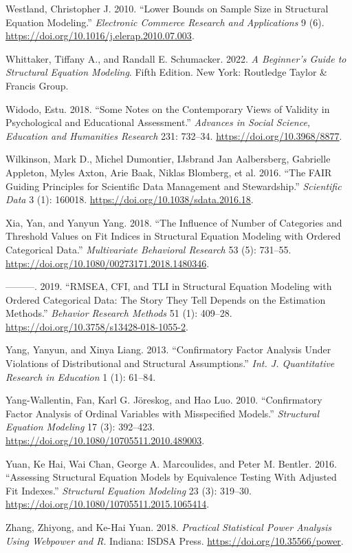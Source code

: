 \documentclass[
  a4paper,
]{article}
\newlength{\cslhangindent}
\newenvironment{CSLReferences}[2] %
 {\begin{list}{}{%
  \setlength{\itemindent}{0pt}
  \setlength{\leftmargin}{0pt}
  \setlength{\parsep}{0pt}
  \ifodd #1
   \setlength{\leftmargin}{\cslhangindent}
   \setlength{\itemindent}{-1\cslhangindent}
  \fi
  \setlength{\itemsep}{#2\baselineskip}}}
 {\end{list}}
\begin{document}
\begin{CSLReferences}{1}{0}
Westland, Christopher J. 2010. {``Lower Bounds on Sample Size in
Structural Equation Modeling.''} \emph{Electronic Commerce Research and
Applications} 9 (6). \url{https://doi.org/10.1016/j.elerap.2010.07.003}.

Whittaker, Tiffany A., and Randall E. Schumacker. 2022. \emph{A
{Beginner}'s {Guide} to {Structural Equation Modeling}}. Fifth Edition.
New York: Routledge Taylor \& Francis Group.

Widodo, Estu. 2018. {``Some {Notes} on the {Contemporary Views} of
{Validity} in {Psychological} and {Educational Assessment}.''}
\emph{Advances in Social Science, Education and Humanities Research}
231: 732--34. \url{https://doi.org/10.3968/8877}.

Wilkinson, Mark D., Michel Dumontier, IJsbrand Jan Aalbersberg,
Gabrielle Appleton, Myles Axton, Arie Baak, Niklas Blomberg, et al.
2016. {``The {FAIR Guiding Principles} for Scientific Data Management
and Stewardship.''} \emph{Scientific Data} 3 (1): 160018.
\url{https://doi.org/10.1038/sdata.2016.18}.

Xia, Yan, and Yanyun Yang. 2018. {``The {Influence} of {Number} of
{Categories} and {Threshold Values} on {Fit Indices} in {Structural
Equation Modeling} with {Ordered Categorical Data}.''}
\emph{Multivariate Behavioral Research} 53 (5): 731--55.
\url{https://doi.org/10.1080/00273171.2018.1480346}.

---------. 2019. {``{RMSEA}, {CFI}, and {TLI} in Structural Equation
Modeling with Ordered Categorical Data: {The} Story They Tell Depends on
the Estimation Methods.''} \emph{Behavior Research Methods} 51 (1):
409--28. \url{https://doi.org/10.3758/s13428-018-1055-2}.

Yang, Yanyun, and Xinya Liang. 2013. {``Confirmatory Factor Analysis
Under Violations of Distributional and Structural Assumptions.''}
\emph{Int. J. Quantitative Research in Education} 1 (1): 61--84.

Yang-Wallentin, Fan, Karl G. Jöreskog, and Hao Luo. 2010.
{``Confirmatory Factor Analysis of Ordinal Variables with Misspecified
Models.''} \emph{Structural Equation Modeling} 17 (3): 392--423.
\url{https://doi.org/10.1080/10705511.2010.489003}.

Yuan, Ke Hai, Wai Chan, George A. Marcoulides, and Peter M. Bentler.
2016. {``Assessing {Structural Equation Models} by {Equivalence Testing
With Adjusted Fit Indexes}.''} \emph{Structural Equation Modeling} 23
(3): 319--30. \url{https://doi.org/10.1080/10705511.2015.1065414}.

Zhang, Zhiyong, and Ke-Hai Yuan. 2018. \emph{Practical Statistical Power
Analysis Using {Webpower} and {R}}. Indiana: ISDSA Press.
\url{https://doi.org/10.35566/power}.

\end{CSLReferences}
\end{document}
